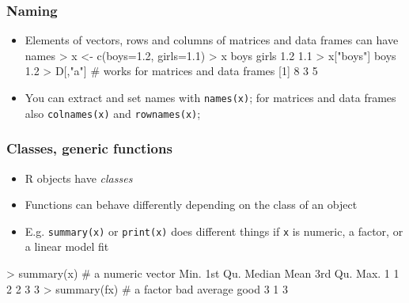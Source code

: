 \documentclass{beamer}
\newcommand{\code}[1]{\texttt{#1}}
\let\overbatim\verbatim
\let\endoverbatim\endverbatim
\newenvironment{vcode}%
{\bgroup\baselineskip=0.8\baselineskip\overbatim}%
{\endoverbatim\egroup}
\newcounter{demo}
\newcommand{\Demo}{\stepcounter{demo}\frametitle{Demo \arabic{demo}}}
\begin{document}

\begin{frame}[fragile]
  \frametitle{Naming}
  \begin{itemize}
  \item Elements of vectors, rows and columns of matrices and data frames can have names
\begin{vcode}
> x <- c(boys=1.2, girls=1.1)
> x
 boys girls 
  1.2   1.1 
> x["boys"]
boys 
 1.2
> D[,"a"]  # works for matrices and data frames
[1] 8 3 5
\end{vcode}
  \item You can extract and set names with \code{names(x)}; for matrices and data frames also \code{colnames(x)} and \code{rownames(x)};
 \end{itemize}
\end{frame}


\begin{frame}[fragile]
  \frametitle{Classes, generic functions}
  \begin{itemize}
  \item R objects have \emph{classes} 
  \item Functions can behave differently depending on the class of an
    object 
  \item E.g. \code{summary(x)} or \code{print(x)} does different
    things if \code{x} is numeric, a factor, or a linear model fit
  \end{itemize}
\begin{vcode}
  > summary(x)  # a numeric vector
   Min. 1st Qu.  Median    Mean 3rd Qu.    Max. 
      1       1       2       2       3       3 
> summary(fx) # a factor
    bad average    good 
      3       1       3 
\end{vcode}
\end{frame}
\end{document}
